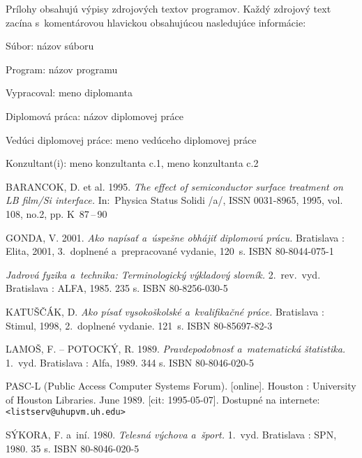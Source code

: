 \documentclass[a4paper]{systemovaPrirucka}
\begin{document}
Prílohy obsahujú výpisy zdrojových textov programov. Každý zdrojový text zacína s~komentárovou hlavickou obsahujúcou nasledujúce informácie:

Súbor: názov súboru

Program: názov programu

Vypracoval:  meno diplomanta

Diplomová práca: názov diplomovej práce

Vedúci diplomovej práce: meno vedúceho diplomovej práce

Konzultant(i): meno konzultanta c.1, meno konzultanta c.2

\newpage\def\refname{Zoznam použitej literatúry}

\begin{thebibliography}{999}
BARANCOK, D. et al. 1995. \emph{The effect of semiconductor surface treatment on LB film/Si interface.} In:~Physica Status Solidi /a/,  ISSN 0031-8965, 1995, vol. 108, no.2, pp. K~87\,--\,90

GONDA, V. 2001. \emph{Ako napísať a~úspešne obhájiť diplomovú prácu.} Bratislava : Elita, 2001, 3.~doplnené a~prepracované vydanie, 120~s. ISBN 80-8044-075-1

\emph{Jadrová fyzika a~technika: Terminologický výkladový slovník.} 2.~rev.~vyd. Bratislava : ALFA, 1985. 235 s. ISBN 80-8256-030-5

KATUŠČÁK, D. \emph{Ako písať vysokoškolské a~kvalifikačné práce.} Bratislava : Stimul, 1998, 2.~doplnené vydanie. 121~s. ISBN 80-85697-82-3


LAMOŠ, F. -- POTOCKÝ, R. 1989. \emph{Pravdepodobnosť a~matematická štatistika.} 1.~vyd. Bratislava : Alfa, 1989. 344 s. ISBN 80-8046-020-5

 PASC-L (Public Access Computer Systems Forum). [online]. Houston : University of Houston Libraries. June 1989. [cit: 1995-05-07]. Dostupné na internete: \verb+<listserv@uhupvm.uh.edu>+

SÝKORA, F. a~iní. 1980. \emph{Telesná výchova a~šport.} 1.~vyd. Bratislava : SPN, 1980. 35 s. ISBN 80-8046-020-5


\end{thebibliography}



\newpage
\end{document}

